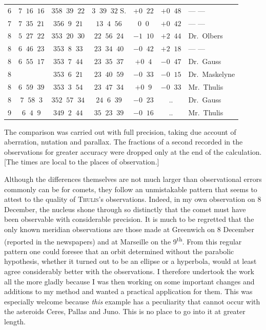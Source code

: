 \begin{center}
\begin{tabular}{|c|c|c|c|c|c|l|}
6 & $7\;\;16\;\;16$ & $358\;\;39\;\;22$ & $3\;\;39\;\;32$ S. & $+0\;\;22$ & $+0\;\;48$ & --- --- \\
7 & $7\;\;35\;\;21$ & $356\;\;9\;\;21$ & $13\;\;4\;\;56$ & $0\;\;0$ & $+0\;\;42$ & --- --- \\
8 & $5\;\;27\;\;22$ & $353\;\;20\;\;30$ & $22\;\;56\;\;24$ & $-1\;\;10$ & $+2\;\;44$ & Dr.\ Olbers \\
8 & $6\;\;46\;\;23$ & $353\;\;8\;\;33$ & $23\;\;34\;\;40$ & $-0\;\;42$ & $+2\;\;18$ & --- --- \\
8 & $6\;\;55\;\;17$ & $353\;\;7\;\;44$ & $23\;\;35\;\;37$ & $+0\;\;4$ & $-0\;\;47$ & Dr.\ Gauss \\
8 & & $353\;\;6\;\;21$ & $23\;\;40\;\;59$ & $-0\;\;33$ & $-0\;\;15$ & Dr.\ Maskelyne \\
8 & $6\;\;59\;\;39$ & $353\;\;3\;\;54$ & $23\;\;47\;\;34$ & $+0\;\;9$ & $-0\;\;33$ & Mr.\ Thulis \\
8 & $7\;\;58\;\;3$ & $352\;\;57\;\;34$ & $24\;\;6\;\;39$ & $-0\;\;23$ & .\quad . & Dr.\ Gauss \\
9 & $6\;\;4\;\;9$ & $349\;\;2\;\;44$ & $35\;\;23\;\;39$ & $-0\;\;16$ & .\quad . & Mr.\ Thulis \\
\hline
\end{tabular}\endgroup\end{center}



\par\indent The comparison was carried out with full precision, taking due
%
account of aberration, nutation and parallax. The fractions of a second recorded in the observations for greater accuracy were dropped only at the end of the calculation. [The times are local to the places of observation.]

\par\indent Although the differences themselves are not much larger than observational errors commonly can be for comets, they follow an unmistakable pattern that seems to attest to the quality of \textsc{Thulis}’s observations. Indeed, in my own observation on 8 December, the nucleus shone through so distinctly that the comet must have been observable with considerable precision. It is much to be regretted that the only known meridian observations are those made at Greenwich on 8 December (reported in the newspapers) and at Marseille on the 9\textsuperscript{th}. From this regular pattern one could foresee that an orbit determined without the parabolic hypothesis, whether it turned out to be an ellipse or a hyperbola, would at least agree considerably better with the observations. I therefore undertook the work all the more gladly because I was then working on some important changes and additions to my method and wanted a practical application for them. This was especially welcome because \emph{this} example has a peculiarity that cannot occur with the asteroids Ceres, Pallas and Juno. This is no place to go into it at greater length.

